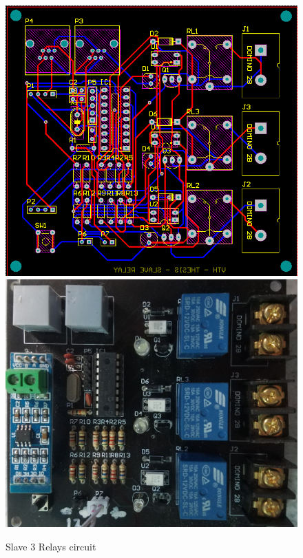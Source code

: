 \begin{figure}[!htbp]
    \begin{center}
    \includegraphics[scale=0.6]{images/s3rLayout.png}\\

    \includegraphics[scale=0.13]{images/s3r.jpg}
    \caption{Slave 3 Relays circuit}
    \label{fig:slave3RelaysCircuit}
    \end{center}
\end{figure}
